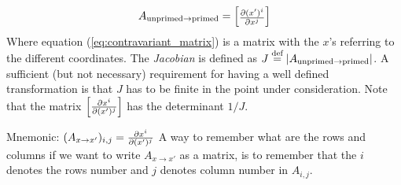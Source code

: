 \documentclass[a4paper, 12pt]{article}
\begin{document}
%
\begin{align}
 A_{\text{unprimed}\to \text{primed}}
 =
 \begin{bmatrix}
  \frac{\partial {(x')^i}}{\partial{x^j}}
 \end{bmatrix}
 \label{eq:contravariant_matrix}
\end{align}
%
Where equation (\ref{eq:contravariant_matrix}) is a matrix with the $x$'s 
referring to the different coordinates. The \emph{Jacobian} is 
defined as $J\overset{\text{def}}{=}|A_{\text{unprimed}\to \text{primed}}|$. A sufficient 
(but not necessary) requirement for having a well defined transformation is 
that $J$ has to be finite in the point under consideration. Note that the matrix
%
$\begin{bmatrix}
 \frac{\partial {x^i}}{\partial{(x')^j}}
\end{bmatrix}$
has the determinant $1/J$.

\vspace{0.5cm}
\begin{greenbox}{Mnemonic: $(A_{x \to x'})_{i,j} = \frac{\partial {x^i}}{\partial{(x')^j}}$}
 A way to remember what are the rows and columns if we want to write $A_{x \to 
 x'}$ as a matrix, is to remember that the $i$ denotes the rows number and 
 $j$ denotes column number in $A_{i,j}$.
\end{greenbox}
\end{document}
